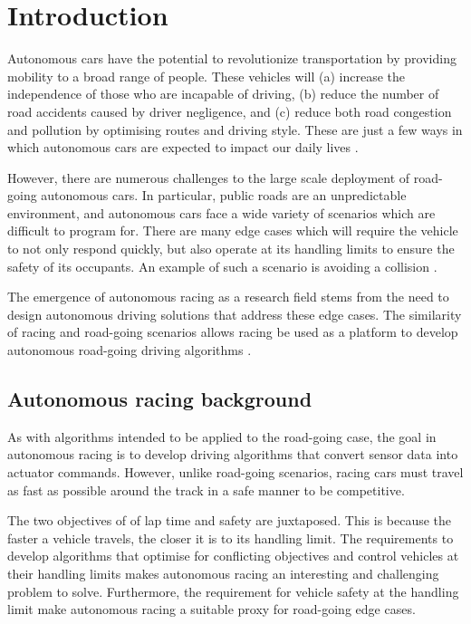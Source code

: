 \chapter{Introduction}
\label{chp:introduction}

Autonomous cars have the potential to revolutionize transportation by providing mobility to a broad range of people. 
These vehicles will (a) increase the independence of those who are incapable of driving, (b) reduce the number of road accidents caused by driver negligence, and (c) reduce both road congestion and pollution by optimising routes and driving style. 
These are just a few ways in which autonomous cars are expected to impact our daily lives \cite{klaver}. 

However, there are numerous challenges to the large scale deployment of road-going autonomous cars. 
In particular, public roads are an unpredictable environment, and autonomous cars face a wide variety of scenarios which are difficult to program for.
There are many edge cases which will require the vehicle to not only respond quickly, but also operate at its handling limits to ensure the safety of its occupants.
An example of such a scenario is avoiding a collision \cite{Barab_s_2017}. 

The emergence of autonomous racing as a research field stems from the need to design autonomous driving solutions that address these edge cases.
The similarity of racing and road-going scenarios allows racing be used as a platform to develop autonomous road-going driving algorithms \cite{Weiss2020a}.

\section{Autonomous racing background}

As with algorithms intended to be applied to the road-going case, the goal in autonomous racing is to develop driving algorithms that convert sensor data into actuator commands.
However, unlike road-going scenarios, racing cars must travel as fast as possible around the track in a safe manner to be competitive.

The two objectives of of lap time and safety are juxtaposed.
This is because the faster a vehicle travels, the closer it is to its handling limit.
The requirements to develop algorithms that optimise for conflicting objectives and control vehicles at their handling limits makes autonomous racing an interesting and challenging problem to solve.
Furthermore, the requirement for vehicle safety at the handling limit make autonomous racing a suitable proxy for road-going edge cases.

